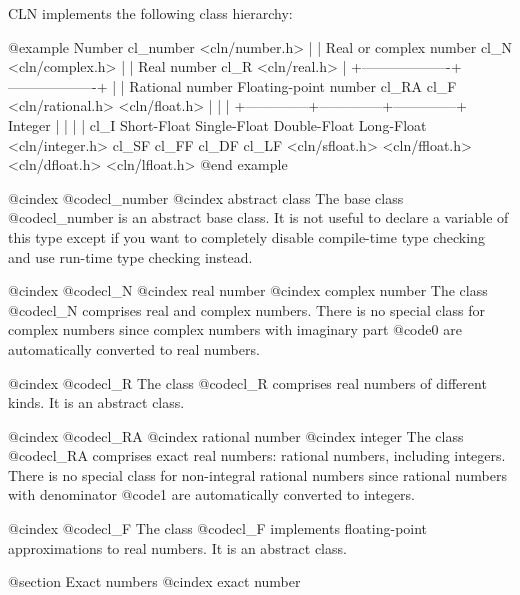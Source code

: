 CLN implements the following class hierarchy:

@example
                        Number
                      cl_number
                    <cln/number.h>
                          |
                          |
                 Real or complex number
                        cl_N
                    <cln/complex.h>
                          |
                          |
                     Real number
                        cl_R
                     <cln/real.h>
                          |
      +-------------------+-------------------+
      |                                       |
Rational number                     Floating-point number
    cl_RA                                   cl_F
<cln/rational.h>                         <cln/float.h>
      |                                       |
      |                +--------------+--------------+--------------+
   Integer             |              |              |              |
    cl_I          Short-Float    Single-Float   Double-Float    Long-Float
<cln/integer.h>      cl_SF          cl_FF          cl_DF          cl_LF
                 <cln/sfloat.h> <cln/ffloat.h> <cln/dfloat.h> <cln/lfloat.h>
@end example

@cindex @code{cl_number}
@cindex abstract class
The base class @code{cl_number} is an abstract base class.
It is not useful to declare a variable of this type except if you want
to completely disable compile-time type checking and use run-time type
checking instead.

@cindex @code{cl_N}
@cindex real number
@cindex complex number
The class @code{cl_N} comprises real and complex numbers. There is
no special class for complex numbers since complex numbers with imaginary
part @code{0} are automatically converted to real numbers.

@cindex @code{cl_R}
The class @code{cl_R} comprises real numbers of different kinds. It is an
abstract class.

@cindex @code{cl_RA}
@cindex rational number
@cindex integer
The class @code{cl_RA} comprises exact real numbers: rational numbers, including
integers. There is no special class for non-integral rational numbers
since rational numbers with denominator @code{1} are automatically converted
to integers.

@cindex @code{cl_F}
The class @code{cl_F} implements floating-point approximations to real numbers.
It is an abstract class.


@section Exact numbers
@cindex exact number

